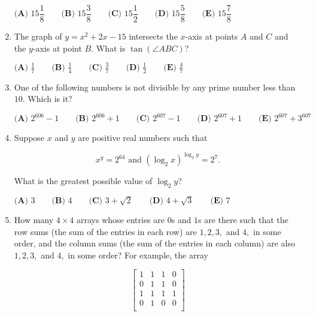 \documentclass{article}
\begin{document}
\begin{enumerate}[label=\arabic*., itemsep=0.5em]
\(\textbf{(A) }15\dfrac{1}{8}  \qquad
\textbf{(B) }15\dfrac{3}{8}  \qquad
\textbf{(C) }15\dfrac{1}{2}  \qquad
\textbf{(D) }15\dfrac{5}{8}  \qquad
\textbf{(E) }15\dfrac{7}{8} \)\par \vspace{0.5em}\item The graph of \(y=x^2+2x-15\) intersects the \(x\)-axis at points \(A\) and \(C\) and the \(y\)-axis at point \(B\). What is \(\tan(\angle ABC)\)?

\(\textbf{(A) }\frac{1}{7} \qquad \textbf{(B) }\frac{1}{4} \qquad \textbf{(C) }\frac{3}{7} \qquad \textbf{(D) }\frac{1}{2} \qquad \textbf{(E) }\frac{4}{7}\)\par \vspace{0.5em}\item One of the following numbers is not divisible by any prime number less than \(10.\) Which is it?

\(\textbf{(A) } 2^{606}-1 \qquad\textbf{(B) } 2^{606}+1 \qquad\textbf{(C) } 2^{607}-1 \qquad\textbf{(D) } 2^{607}+1\qquad\textbf{(E) } 2^{607}+3^{607}\)\par \vspace{0.5em}\item Suppose \(x\) and \(y\) are positive real numbers such that

\begin{equation*}
x^y=2^{64}\text{ and }(\log_2{x})^{\log_2{y}}=2^{7}.
\end{equation*}

What is the greatest possible value of \(\log_2{y}\)?

\(\textbf{(A) }3 \qquad \textbf{(B) }4 \qquad \textbf{(C) }3+\sqrt{2} \qquad \textbf{(D) }4+\sqrt{3} \qquad \textbf{(E) }7\)\par \vspace{0.5em}\item How many \(4 \times 4\) arrays whose entries are \(0\)s and \(1\)s are there such that the row sums (the sum of the entries in each row) are \(1, 2, 3,\) and \(4,\) in some order, and the column sums (the sum of the entries in each column) are also \(1, 2, 3,\) and \(4,\) in some order? For example, the array

\begin{equation*}
\left[
  \begin{array}{cccc}
    1 & 1 & 1 & 0 \\
    0 & 1 & 1 & 0 \\
    1 & 1 & 1 & 1 \\
    0 & 1 & 0 & 0 \\
  \end{array}
\right]
\end{equation*}


\end{enumerate}
\end{document}
